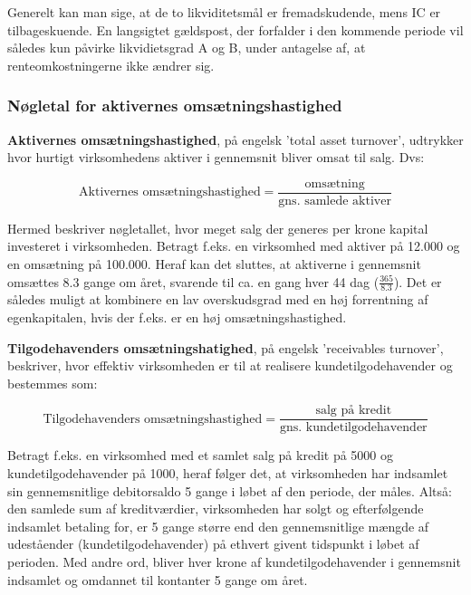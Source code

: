 \documentclass[10pt,reqno, usenames]{article}
\begin{document}
\vspace{10 pt}

Generelt kan man sige, at de to likviditetsmål er fremadskudende, mens IC er tilbageskuende. En langsigtet gældspost, der forfalder i den kommende periode vil således kun påvirke likvidietsgrad A og B, under antagelse af, at renteomkostningerne ikke ændrer sig.  

\subsubsection{Nøgletal for aktivernes omsætningshastighed}
\textbf{Aktivernes omsætningshastighed}, på engelsk 'total asset turnover', udtrykker hvor hurtigt virksomhedens aktiver i gennemsnit bliver omsat til salg. Dvs: 

\begin{equation}
    \text{Aktivernes omsætningshastighed} =  \frac{\text{omsætning}}{\text{gns. samlede aktiver}}
\end{equation}

Hermed beskriver nøgletallet, hvor meget salg der generes per krone kapital investeret i virksomheden. Betragt f.eks. en virksomhed med aktiver på 12.000 og en omsætning på 100.000. Heraf kan det sluttes, at aktiverne i gennemsnit omsættes 8.3 gange om året, svarende til ca. en gang hver 44 dag ($\frac{365}{8.3}$). Det er således muligt at kombinere en lav overskudsgrad med en høj forrentning af egenkapitalen, hvis der f.eks. er en høj omsætningshastighed. 

\vspace{10 pt}
\textbf{Tilgodehavenders omsætningshatighed}, på engelsk 'receivables turnover', beskriver, hvor effektiv virksomheden er til at realisere kundetilgodehavender og bestemmes som: 

\begin{equation}
    \text{Tilgodehavenders omsætningshastighed} =  \frac{\text{salg på kredit}}{\text{gns. kundetilgodehavender}}
\end{equation}

Betragt f.eks. en virksomhed med et samlet salg på kredit på 5000 og kundetilgodehavender på 1000, heraf følger det, at virksomheden har indsamlet sin gennemsnitlige debitorsaldo 5 gange i løbet af den periode, der måles. Altså: den samlede sum af kreditværdier, virksomheden har solgt og efterfølgende indsamlet betaling for, er 5 gange større end den gennemsnitlige mængde af udeståender (kundetilgodehavender) på ethvert givent tidspunkt i løbet af perioden. Med andre ord, bliver hver krone af kundetilgodehavender i gennemsnit indsamlet og omdannet til kontanter 5 gange om året.
\end{document}
